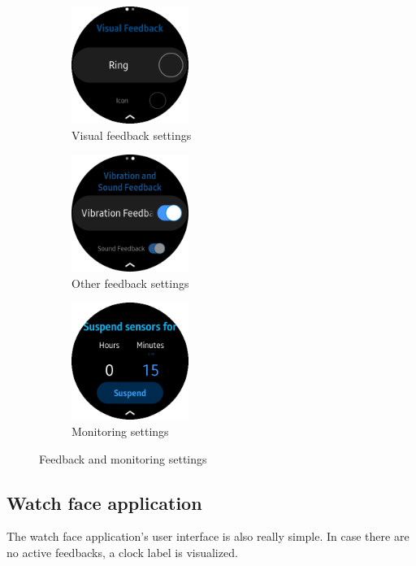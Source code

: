 \documentclass[conference, a4paper, 10pt, twocolumn]{IEEEtran}
\begin{document}
\begin{figure}[t!]
    \centering
    \begin{subfigure}[t]{0.32\textwidth}
        \centering
        \includegraphics[height=1.5in]{img/settingsVisualFeedback.png}
        \caption{Visual feedback settings}
        \label{fig:visualFeedbackSettings}
    \end{subfigure}%
    \begin{subfigure}[t]{0.32\textwidth}
        \centering
        \includegraphics[height=1.5in]{img/settingsOtherFeedback.png}
        \caption{Other feedback settings}
        \label{fig:otherFeedbackSettings}
    \end{subfigure}
    \begin{subfigure}[t]{0.32\textwidth}
        \centering
        \includegraphics[height=1.5in]{img/settingsSuspend.png}
        \caption{Monitoring settings}
        \label{fig:monitoringSettings}
    \end{subfigure}
    \caption{Feedback and monitoring settings}
    \label{fig:feedbackSettingsImage}
\end{figure}


\subsection{Watch face application}
The watch face application's user interface is also really simple. In case there are no active feedbacks, a clock label is visualized.  
\end{document}
